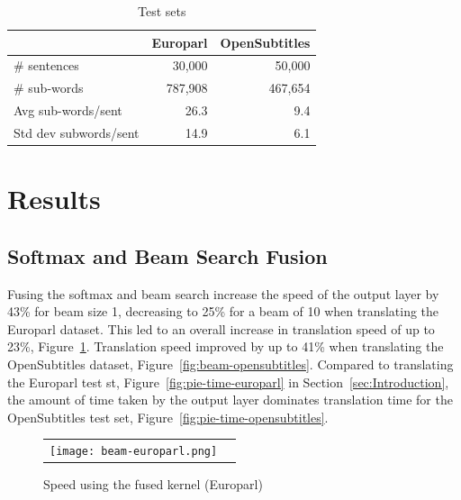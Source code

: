 \documentclass[11pt,a4paper]{article}
\begin{document}
\begin{table}
\begin{center}
\small
\begin{tabular}{|l|r|r|} \hline
		  & Europarl		& OpenSubtitles \\ \hline
\# sentences  	  & 30,000 		& 50,000 \\
\# sub-words 	  & 787,908 		& 467,654 \\ 
Avg sub-words/sent & 26.3		& 9.4 \\
Std dev subwords/sent & 14.9		& 6.1 \\ \hline
\end{tabular}
\end{center}
\caption{Test sets}
\label{tab:corpora}
\end{table}


\section{Results}
\label{sec:Results}

\subsection{Softmax and Beam Search Fusion}

Fusing the softmax and beam search increase the speed of the output layer by 43\% for beam size 1, decreasing to 25\% for a beam of 10 when translating the Europarl dataset. This led to an overall increase in translation speed of up to 23\%, Figure~\ref{fig:beam-europarl}. Translation speed improved by up to 41\% when translating the OpenSubtitles dataset, Figure~\ref{fig:beam-opensubtitles}. Compared to translating the Europarl test st, Figure~\ref{fig:pie-time-europarl} in Section~\ref{sec:Introduction}, the amount of time taken by the output layer dominates translation time for the OpenSubtitles test set, Figure~\ref{fig:pie-time-opensubtitles}.

\begin{figure}
\centering
\begin{tabular}{cc}
{\texttt{[image: beam-europarl.png]}} 
\end{tabular}
\caption{Speed using the fused kernel (Europarl)}
\label{fig:beam-europarl}
\end{figure} 
\end{document}
